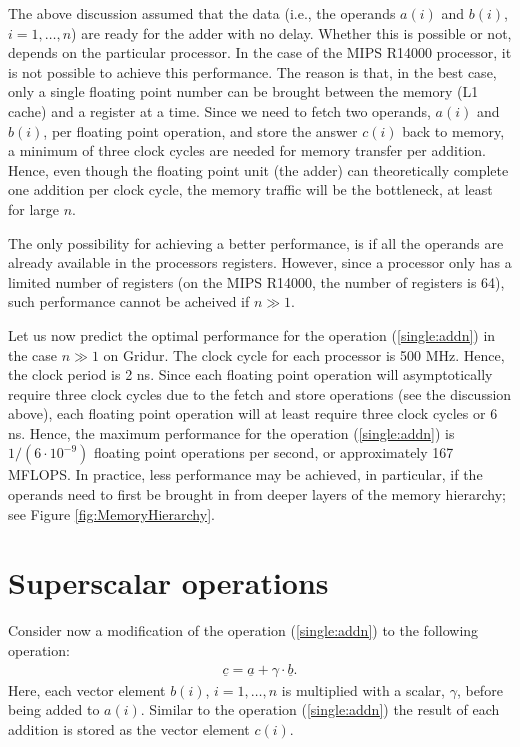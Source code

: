 \documentclass[11pt]{article}
\begin{document}
The above discussion assumed that the data (i.e., the operands
$a(i)$ and $b(i)$, $i=1,\ldots,n$) are ready for the adder with no delay. 
Whether this is possible or not, depends on the particular processor. 
In the case of the MIPS R14000 processor, it is not possible 
to achieve this performance. The reason is that, in the best case, 
only a single floating point number can be brought between the memory
(L1 cache) and a register at a time. Since we need to fetch two operands, 
$a(i)$ and $b(i)$, per floating point operation, and store the answer $c(i)$
back to memory, 
a minimum of three clock cycles are needed for memory transfer per addition. 
Hence, even though the floating point unit (the adder) can theoretically 
complete one addition per clock cycle, the memory traffic will be the bottleneck, 
at least for large $n$. 

The only possibility for achieving a better performance, 
is if all the operands are already available in the processors registers. 
However, since a processor only has a limited number of registers
(on the MIPS R14000, the number of registers is 64), such performance
cannot be acheived if $n\gg 1$. 

Let us now predict the optimal performance for the operation (\ref{single:addn})
in the case $n\gg 1$ on Gridur. The clock cycle for each processor is 500 MHz. 
Hence, the clock period is 2 ns. Since each floating point operation will 
asymptotically require three clock cycles due to the fetch and store operations
(see the discussion above), each floating point operation will at least require 
three clock cycles or 6 ns. Hence, the maximum performance for the operation 
(\ref{single:addn}) is $1/(6\cdot 10^{-9})$ floating point operations per second, 
or approximately 167 MFLOPS. In practice, less performance may be achieved, 
in particular, if the operands need to first be brought in from deeper layers 
of the memory hierarchy; see Figure \ref{fig:MemoryHierarchy}.


\section{Superscalar operations}

Consider now a modification of the operation (\ref{single:addn}) to 
the following operation:
\begin{align}
 \underline{c} = \underline{a} + \gamma\cdot \underline{b} .
 \label{single:addmultn}
 \end{align}
Here, each vector element $b(i)$, $i=1,\ldots,n$ is multiplied with a 
scalar, $\gamma$, before being added to $a(i)$. Similar to the operation
(\ref{single:addn}) the result of each addition is stored as the vector element $c(i)$. 
\end{document}
